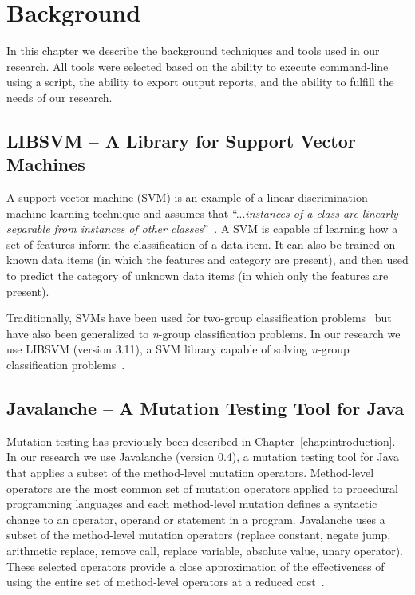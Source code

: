 \chapter{Background}
\label{chap:background}
In this chapter we describe the background techniques and tools used in our research. All tools were selected based on the ability to execute command-line using a script, the ability to export output reports, and the ability to fulfill the needs of our research.


\section{LIBSVM -- A Library for Support Vector Machines}
\label{sec:libsvm}
A support vector machine (SVM) is an example of a linear discrimination machine learning technique and assumes that ``...\emph{instances of a class are linearly separable from instances of other classes}''~\cite{ALP04}. A SVM is capable of learning how a set of features inform the classification of a data item. It can also be trained on known data items (in which the features and category are present), and then used to predict the category of  unknown data items (in which only the features are present).

Traditionally, SVMs have been used for two-group classification problems~\cite{CV95} but have also been generalized to \emph{n}-group classification problems. In our research we use LIBSVM (version 3.11), a SVM library capable of solving \emph{n}-group classification problems~\cite{CL11}.


\section{Javalanche -- A Mutation Testing Tool for Java}
\label{sec:javalanche}
Mutation testing has previously been described in Chapter~\ref{chap:introduction}. In our research we use Javalanche (version 0.4), a mutation testing tool for Java~\cite{SZ09} that applies a subset of the method-level mutation operators. Method-level operators are the most common set of mutation operators applied to procedural programming languages and each method-level mutation defines a syntactic change to an operator, operand or statement in a program. Javalanche uses a subset of the method-level mutation operators (replace constant, negate jump, arithmetic replace, remove call, replace variable, absolute value, unary operator). These selected operators provide a close approximation of the effectiveness of using the entire set of method-level operators at a reduced cost~\cite{OLR+96}.

